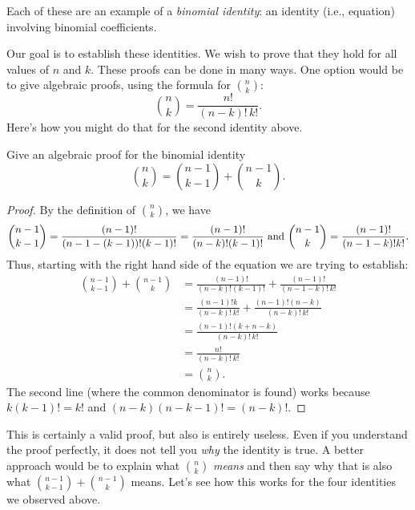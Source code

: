 \documentclass[12pt]{article}
\begin{document}
Each of these are an example of a {\em binomial identity}: an identity (i.e., equation) involving binomial coefficients.

Our goal is to establish these identities.  We wish to prove that they hold for all values of $n$ and $k$.  These proofs can be done in many ways.  One option would be to give algebraic proofs, using the formula for ${n \choose k}$:
\[{n \choose k} = \frac{n!}{(n-k)!\,k!}.\]
Here's how you might do that for the second identity above.

\begin{example}
  Give an algebraic proof for the binomial identity
  \[{n \choose k} = {n-1\choose k-1} + {n-1 \choose k}.\]
  \begin{proof}
    By the definition of ${n \choose k}$, we have
    \[{n-1 \choose k-1} = \frac{(n-1)!}{(n-1-(k-1))!(k-1)!} = \frac{(n-1)!}{(n-k)!(k-1)!} \hfill \mbox{ and } {n-1 \choose k} = \frac{(n-1)!}{(n-1-k)!k!}.\]
    Thus, starting with the right hand side of the equation we are trying to establish:
    \begin{align*}
      {n-1 \choose k-1} + {n-1 \choose k} & = \frac{(n-1)!}{(n-k)!(k-1)!}+ \frac{(n-1)!}{(n-1-k)!\,k!}\\
      & = \frac{(n-1)!k}{(n-k)!\,k!} + \frac{(n-1)!(n-k)}{(n-k)!\,k!}\\
      & = \frac{(n-1)!(k+n-k)}{(n-k)!\,k!} \\
      & = \frac{n!}{(n-k)!\, k!} \\
      & = {n \choose k}.
    \end{align*}
    The second line (where the common denominator is found) works because $k(k-1)! = k!$ and $(n-k)(n-k-1)! = (n-k)!$.
  \end{proof}

\end{example}

This is certainly a valid proof, but also is entirely useless.  Even if you understand the proof perfectly, it does not tell you {\em why} the identity is true.  A better approach would be to explain what ${n \choose k}$ {\em means} and then say why that is also what ${n-1 \choose k-1} + {n-1 \choose k}$ means.  Let's see how this works for the four identities we observed above.
\end{document}

